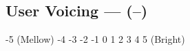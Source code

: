 \subsection[User Voicing]{User Voicing --- \UiKey{\I}\UiKey{\SET}(--)}




































-5 (Mellow)
-4
-3
-2
-1
0
1
2
3
4
5 (Bright)

